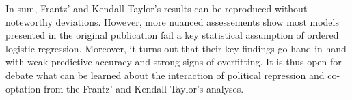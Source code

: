 In sum, Frantz' and Kendall-Taylor's results can be 
reproduced without noteworthy deviations. However, more 
nuanced assessements show most models presented 
in the original publication fail a key statistical 
assumption of ordered logistic regression. Moreover, it 
turns out that their key findings go hand in hand with weak 
predictive accuracy and strong signs of overfitting. It is 
thus open for debate what can be learned about the 
interaction of political repression and co-optation from the
Frantz' and Kendall-Taylor's analyses.